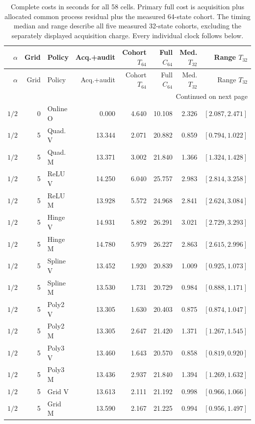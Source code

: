 \begingroup
\small\setlength{\tabcolsep}{3pt}
\begin{longtable}{rrlrrrrr}
\caption{Complete costs in seconds for all 58 cells. Primary full cost is acquisition plus allocated common process residual plus the measured 64-state cohort. The timing median and range describe all five measured 32-state cohorts, excluding the separately displayed acquisition charge. Every individual clock follows below.}\label{tab:fullcost121}\\
\toprule
$\alpha$ & Grid & Policy & Acq.+audit & Cohort $T_{64}$ & Full $C_{64}$ & Med. $T_{32}$ & Range $T_{32}$\\
\midrule\endfirsthead
\toprule
$\alpha$ & Grid & Policy & Acq.+audit & Cohort $T_{64}$ & Full $C_{64}$ & Med. $T_{32}$ & Range $T_{32}$\\
\midrule\endhead
\midrule\multicolumn{8}{r}{Continued on next page}\\\endfoot
\bottomrule\endlastfoot
$1/2$ & 0 & Online O & 0.000 & 4.640 & 10.108 & 2.326 & $[2.087,2.471]$\\
$1/2$ & 5 & Quad. V & 13.344 & 2.071 & 20.882 & 0.859 & $[0.794,1.022]$\\
$1/2$ & 5 & Quad. M & 13.371 & 3.002 & 21.840 & 1.366 & $[1.324,1.428]$\\
$1/2$ & 5 & ReLU V & 14.250 & 6.040 & 25.757 & 2.983 & $[2.814,3.258]$\\
$1/2$ & 5 & ReLU M & 13.928 & 5.572 & 24.968 & 2.841 & $[2.624,3.084]$\\
$1/2$ & 5 & Hinge V & 14.931 & 5.892 & 26.291 & 3.021 & $[2.729,3.293]$\\
$1/2$ & 5 & Hinge M & 14.780 & 5.979 & 26.227 & 2.863 & $[2.615,2.996]$\\
$1/2$ & 5 & Spline V & 13.452 & 1.920 & 20.839 & 1.009 & $[0.925,1.073]$\\
$1/2$ & 5 & Spline M & 13.530 & 1.731 & 20.729 & 0.984 & $[0.888,1.171]$\\
$1/2$ & 5 & Poly2 V & 13.305 & 1.630 & 20.403 & 0.875 & $[0.874,1.047]$\\
$1/2$ & 5 & Poly2 M & 13.305 & 2.647 & 21.420 & 1.371 & $[1.267,1.545]$\\
$1/2$ & 5 & Poly3 V & 13.460 & 1.643 & 20.570 & 0.858 & $[0.819,0.920]$\\
$1/2$ & 5 & Poly3 M & 13.436 & 2.937 & 21.840 & 1.394 & $[1.269,1.632]$\\
$1/2$ & 5 & Grid V & 13.613 & 2.111 & 21.192 & 0.998 & $[0.966,1.066]$\\
$1/2$ & 5 & Grid M & 13.590 & 2.167 & 21.225 & 0.994 & $[0.956,1.497]$\\

\end{longtable}
